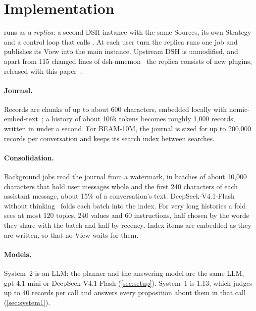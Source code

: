 \section{Implementation}
\label{sec:impl}

\sys{} runs as a \emph{replica}: a second DSH instance with the same Sources, its own Strategy and a control loop that calls \jev.
At each user turn the replica runs one job and publishes its View into the main instance.
Upstream DSH is unmodified, and apart from 115 changed lines of dsh-mnemon~\citep{mnemon2026code} the replica consists of new plugins, released with this paper~\citep{mnemon2026artifact}.

\paragraph{Journal.}
Records are chunks of up to about 600 characters, embedded locally with nomic-embed-text~\citep{nussbaum2024nomic}; a \lme{} history of about 106k tokens becomes roughly 1,000 records, written in under a second.
For BEAM-10M, the journal is sized for up to 200,000 records per conversation and keeps its search index between searches.

\paragraph{Consolidation.}
Background jobs read the journal from a watermark, in batches of about 10,000 characters that hold user messages whole and the first 240 characters of each assistant message, about 15\% of a conversation's text.
DeepSeek-V4.1-Flash without thinking~\citep{deepseekflash2026} folds each batch into the index.
For very long histories a fold sees at most 120 topics, 240 values and 60 instructions, half chosen by the words they share with the batch and half by recency.
Index items are embedded as they are written, so that no View waits for them.

\paragraph{Models.}
System~2 is an LLM: the planner and the answering model are the same LLM, gpt-4.1-mini or DeepSeek-V4.1-Flash (\cref{sec:setup}).
System~1 is \jev{} 1.13, which judges up to 40 records per call and answers every proposition about them in that call (\cref{sec:system1}).
